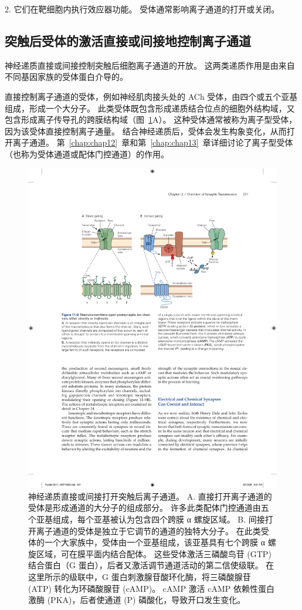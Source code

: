 2. 它们在靶细胞内执行效应器功能。
受体通常影响离子通道的打开或关闭。



\subsection{突触后受体的激活直接或间接地控制离子通道}

神经递质直接或间接控制突触后细胞离子通道的开放。
这两类递质作用是由来自不同基因家族的受体蛋白介导的。


直接控制离子通道的受体，例如神经肌肉接头处的 ACh 受体，由四个或五个亚基组成，形成一个大分子。
此类受体既包含形成递质结合位点的细胞外结构域，又包含形成离子传导孔的跨膜结构域（图~\ref{fig:11_9}A）。
这种受体通常被称为离子型受体，因为该受体直接控制离子通量。
结合神经递质后，受体会发生构象变化，从而打开离子通道。
第~\ref{chap:chap12}~章和第~\ref{chap:chap13}~章详细讨论了离子型受体（也称为受体通道或配体门控通道）的作用。

\begin{figure}[htbp]
	\centering
	\includegraphics[width=0.7\linewidth]{chap11/fig_11_9}
	\caption{神经递质直接或间接打开突触后离子通道。 A. 直接打开离子通道的受体是形成通道的大分子的组成部分。 许多此类配体门控通道由五个亚基组成，每个亚基被认为包含四个跨膜 α 螺旋区域。 B. 间接打开离子通道的受体是独立于它调节的通道的独特大分子。 在此类受体的一个大家族中，受体由一个亚基组成，该亚基具有七个跨膜 α 螺旋区域，可在膜平面内结合配体。 这些受体激活三磷酸鸟苷 (GTP) 结合蛋白（G 蛋白），后者又激活调节通道活动的第二信使级联。 在这里所示的级联中，G 蛋白刺激腺苷酸环化酶，将三磷酸腺苷 (ATP) 转化为环磷酸腺苷 (cAMP)。 cAMP 激活 cAMP 依赖性蛋白激酶 (PKA)，后者使通道 (P) 磷酸化，导致开口发生变化。}
	\label{fig:11_9}
\end{figure}


